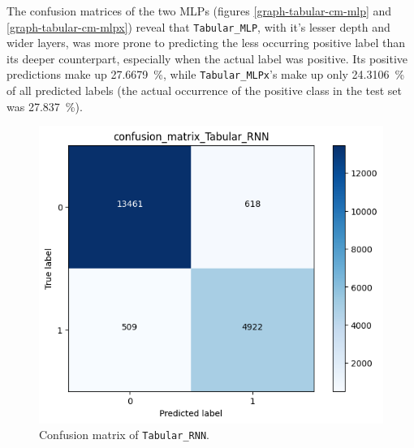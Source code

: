 The confusion matrices of the two MLPs (figures \ref{graph-tabular-cm-mlp} and \ref{graph-tabular-cm-mlpx})
reveal that \texttt{Tabular\_MLP}, with it's lesser depth and wider layers, was more prone to predicting
the less occurring positive label than its deeper counterpart, especially when the actual label was positive.
Its positive predictions make up 27.6679~\%, while
\texttt{Tabular\_MLPx}'s make up only 24.3106~\%
of all predicted labels (the actual occurrence of the positive class in the test set was 27.837~\%).


\begin{figure}[!h]
    \centering
    \begin{minipage}{0.48\textwidth}
        \centering
        \captionsetup{justification=centering}
        \includegraphics[width=\linewidth]{obrazky-figures/Tabular_experiment/confusion_matrix_Tabular_RNN_2023-03-25_14:48:24.png}
        \caption{Confusion matrix of \texttt{Tabular\_RNN}.}
        \label{graph-tabular-cm-rnn}
    \end{minipage}
    \begin{minipage}{0.48\textwidth}
        \centering
        \captionsetup{justification=centering}

\end{minipage}
\end{figure}
